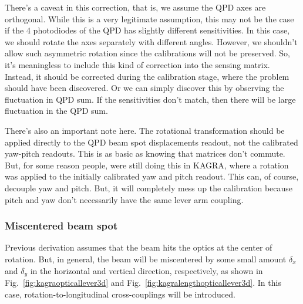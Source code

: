 There's a caveat in this correction, that is, we assume the QPD axes are orthogonal.
While this is a very legitimate assumption, this may not be the case if the 4 photodiodes of the QPD has slightly different sensitivities.
In this case, we should rotate the axes separately with different angles.
However, we shouldn't allow such asymmetric rotation since the calibrations will not be preserved.
So, it's meaningless to include this kind of correction into the sensing matrix.
Instead, it should be corrected during the calibration stage, where the problem should have been discovered.
Or we can simply discover this by observing the fluctuation in QPD sum.
If the sensitivities don't match, then there will be large fluctuation in the QPD sum.

There's also an important note here.
The rotational transformation should be applied directly to the QPD beam spot displacements readout, not the calibrated yaw-pitch readouts.
This is as basic as knowing that matrices don't commute.
But, for some reason people, were still doing this in KAGRA, where a rotation was applied to the initially calibrated yaw and pitch readout.
This can, of course, decouple yaw and pitch.
But, it will completely mess up the calibration because pitch and yaw don't necessarily have the same lever arm coupling.

\subsubsection{Miscentered beam spot \label{sec:miscentered_beam_spot}}
Previous derivation assumes that the beam hits the optics at the center of rotation.
But, in general, the beam will be miscentered by some small amount $\delta_x$ and $\delta_y$ in the horizontal and vertical direction, respectively, as shown in Fig.~\ref{fig:kagraopticallever3d} and Fig.~\ref{fig:kagralengthopticallever3d}.
In this case, rotation-to-longitudinal cross-couplings will be introduced.

